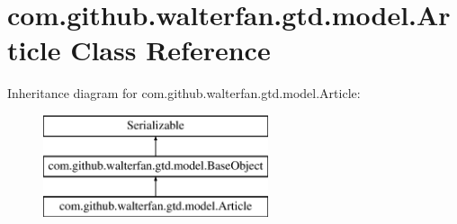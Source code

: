 \hypertarget{classcom_1_1github_1_1walterfan_1_1gtd_1_1model_1_1Article}{\section{com.\-github.\-walterfan.\-gtd.\-model.\-Article Class Reference}
\label{classcom_1_1github_1_1walterfan_1_1gtd_1_1model_1_1Article}
}
Inheritance diagram for com.\-github.\-walterfan.\-gtd.\-model.\-Article\-:\begin{figure}[H]
\begin{center}
\leavevmode
\includegraphics[height=3.000000cm]{classcom_1_1github_1_1walterfan_1_1gtd_1_1model_1_1Article}
\end{center}
\end{figure}

